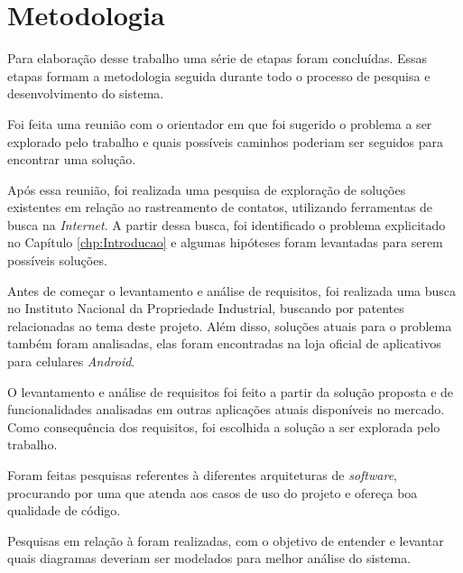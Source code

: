 \chapter{Metodologia}\label{chp:metodologia}

Para elaboração desse trabalho uma série de etapas foram concluídas. Essas etapas formam a metodologia seguida durante todo o processo de pesquisa e desenvolvimento do sistema.

Foi feita uma reunião com o orientador em que foi sugerido o problema a ser explorado pelo trabalho e quais possíveis caminhos poderiam ser seguidos para encontrar uma solução.

Após essa reunião, foi realizada uma pesquisa de exploração de soluções existentes em relação ao rastreamento de contatos, utilizando ferramentas de busca na \textit{Internet}. A partir dessa busca, foi identificado o problema explicitado no Capítulo \ref{chp:Introducao} e algumas hipóteses foram levantadas para serem possíveis soluções.

Antes de começar o levantamento e análise de requisitos, foi realizada uma busca no Instituto Nacional da Propriedade Industrial, buscando por patentes relacionadas ao tema deste projeto. Além disso, soluções atuais para o problema também foram analisadas, elas foram encontradas na loja oficial de aplicativos para celulares \textit{Android}.

O levantamento e análise de requisitos foi feito a partir da solução proposta e de funcionalidades analisadas em outras aplicações atuais disponíveis no mercado. Como consequência dos requisitos, foi escolhida a solução a ser explorada pelo trabalho.

Foram feitas pesquisas referentes à diferentes arquiteturas de \textit{software}, procurando por uma que atenda aos casos de uso do projeto e ofereça boa qualidade de código.

Pesquisas em relação à   foram realizadas, com o objetivo de entender e levantar quais diagramas deveriam ser modelados para melhor análise do sistema.

